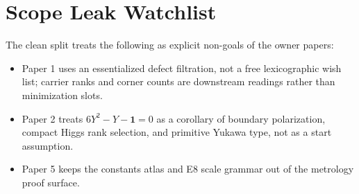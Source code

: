 \documentclass[11pt,a4paper]{article}
\begin{document}
\section{Scope Leak Watchlist}
The clean split treats the following as explicit non-goals of the owner papers:
\begin{itemize}[leftmargin=1.5em]
    \item Paper 1 uses an essentialized defect filtration, not a free lexicographic wish list; carrier
    ranks and corner counts are downstream readings rather than minimization slots.
    \item Paper 2 treats $6Y^2-Y-\mathbf 1=0$ as a corollary of boundary polarization, compact Higgs
    rank selection, and primitive Yukawa type, not as a start assumption.
    \item Paper 5 keeps the constants atlas and E8 scale grammar out of the metrology proof surface.
\end{itemize}
\end{document}
